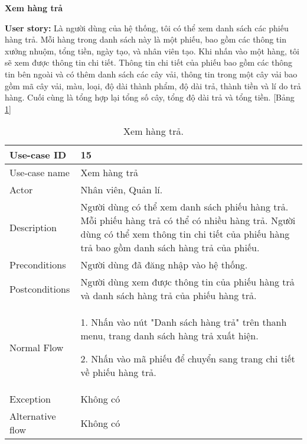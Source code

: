 \textbf{Xem hàng trả}\par
\textbf{User story:} Là người dùng của hệ thống, tôi có thể xem danh sách các phiếu hàng trả. Mỗi hàng trong danh sách này là một phiếu, bao gồm các thông tin xưởng nhuộm, tổng tiền, ngày tạo, và nhân viên tạo. Khi nhấn vào một hàng, tôi sẽ xem được thông tin chi tiết. Thông tin chi tiết của phiếu bao gồm các thông tin bên ngoài và có thêm danh sách các cây vải, thông tin trong một cây vải bao gồm mã cây vải, màu, loại, độ dài thành phẩm, độ dài trả, thành tiền và lí do trả hàng. Cuối cùng là tổng hợp lại tổng số cây, tổng độ dài trả và tổng tiền. [Bảng \ref{bang12}]
\begin{table}[H]
    \centering
    \begin{tabular}{|m{3cm}|m{10cm}|}
    \hline 
        Use-case ID & 15\\ \hline
        Use-case name & Xem hàng trả\\ \hline
        Actor & Nhân viên, Quản lí.\\ \hline
        Description & Người dùng có thể xem danh sách phiếu hàng trả. Mỗi phiếu hàng trả có thể có nhiều hàng trả. Người dùng có thể xem thông tin chi tiết của phiếu hàng trả bao gồm danh sách hàng trả của phiếu.\\ \hline
        Preconditions & Người dùng đã đăng nhập vào hệ thống.\\ \hline
        Postconditions & Người dùng xem được thông tin của phiếu hàng trả và danh sách hàng trả của phiếu hàng trả.\\ \hline
        Normal Flow & 
        1. Nhấn vào nút "Danh sách hàng trả" trên thanh menu, trang danh sách hàng trả xuất hiện.\par
        2. Nhấn vào mã phiếu để chuyển sang trang chi tiết về phiếu hàng trả.
        \\ \hline
        Exception & Không có\\ \hline
        Alternative flow & Không có\\ 
    \hline 
    \end{tabular}
    \caption{Xem hàng trả.}
    \label{bang12}
\end{table}


